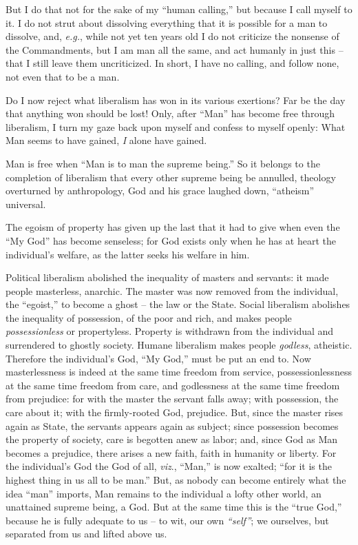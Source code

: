 But I do that not for the sake of my ``human calling,'' but because I call 
myself to it. I do not strut about dissolving everything that it is possible 
for a man to dissolve, and, \textit{e.g.}, while not yet ten years old I do 
not criticize the nonsense of the Commandments, but I am man all the same, and 
act humanly in just this -- that I still leave them uncriticized. In short, I 
have no calling, and follow none, not even that to be a man.

Do I now reject what liberalism has won in its various exertions? Far be the 
day that anything won should be lost! Only, after ``Man'' has become free 
through liberalism, I turn my gaze back upon myself and confess to myself 
openly: What Man seems to have gained, \textit{I} alone have gained.

Man is free when ``Man is to man the supreme being.'' So it belongs to the 
completion of liberalism that every other supreme being be annulled, theology 
overturned by anthropology, God and his grace laughed down, ``atheism'' 
universal.

The egoism of property has given up the last that it had to give when even the 
``My God'' has become senseless; for God exists only when he has at heart 
the individual's welfare, as the latter seeks his welfare in him.

Political liberalism abolished the inequality of masters and servants: it made 
people masterless, anarchic. The master was now removed from the individual, 
the ``egoist,'' to become a ghost -- the law or the State. Social liberalism 
abolishes the inequality of possession, of the poor and rich, and makes people 
\textit{possessionless} or propertyless. Property is withdrawn from the 
individual and surrendered to ghostly society. Humane liberalism makes people 
\textit{godless}, atheistic. Therefore the individual's God, ``My God,'' 
must be put an end to. Now masterlessness is indeed at the same time freedom 
from service, possessionlessness at the same time freedom from care, and 
godlessness at the same time freedom from prejudice: for with the master the 
servant falls away; with possession, the care about it; with the firmly-rooted 
God, prejudice. But, since the master rises again as State, the servants 
appears again as subject; since possession becomes the property of society, 
care is begotten anew as labor; and, since God as Man becomes a prejudice, 
there arises a new faith, faith in humanity or liberty. For the individual's 
God the God of all, \textit{viz}., ``Man,'' is now exalted; ``for it is the 
highest thing in us all to be man.'' But, as nobody can become entirely what 
the idea ``man'' imports, Man remains to the individual a lofty other world, 
an unattained supreme being, a God. But at the same time this is the ``true 
God,'' because he is fully adequate to us -- to wit, our own 
\textit{``self''}; we ourselves, but separated from us and lifted above us.

